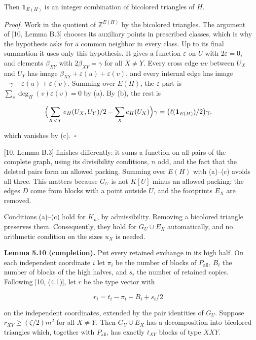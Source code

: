 \documentclass[english,11pt,a4paper]{article}
\begin{document}
Then \(\mathbf 1_{E(H)}\) is an integer combination of bicolored triangles of \(H\).

\emph{Proof.} Work in the quotient of \(\mathbb Z^{E(H)}\) by the bicolored triangles. The argument of {[}10, Lemma B.3{]} chooses its auxiliary points in prescribed classes, which is why the hypothesis asks for a common neighbor in every class. Up to its final summation it uses only this hypothesis. It gives a function \(\varepsilon\) on \(U\) with \(2\varepsilon=0\), and elements \(\beta_{XY}\) with \(2\beta_{XY}=\gamma\) for all \(X\ne Y\). Every cross edge \(uv\) between \(U_X\) and \(U_Y\) has image \(\beta_{XY}+\varepsilon(u)+\varepsilon(v)\), and every internal edge has image \(-\gamma+\varepsilon(u)+\varepsilon(v)\). Summing over \(E(H)\), the \(\varepsilon\)-part is \(\sum_v\deg_H(v)\varepsilon(v)=0\) by (a). By (b), the rest is

\nopagebreak[4]
\[\Bigl(\sum_{X<Y}e_H(U_X,U_Y)/2-\sum_Xe_H(U_X)\Bigr)\gamma=\bigl(\ell(\mathbf 1_{E(H)})/2\bigr)\gamma,\]

which vanishes by (c).~\(\square\)

{[}10, Lemma B.3{]} finishes differently: it sums a function on all pairs of the complete graph, using its divisibility conditions, \(n\) odd, and the fact that the deleted pairs form an allowed packing. Summing over \(E(H)\) with (a)--(c) avoids all three. This matters because \(G_U\) is not \(K[U]\) minus an allowed packing: the edges \(D\) come from blocks with a point outside \(U\), and the footprints \(E_X\) are removed.

Conditions (a)--(c) hold for \(K_n\), by admissibility. Removing a bicolored triangle preserves them. Consequently, they hold for \(G_U\cup E_X\) automatically, and no arithmetic condition on the sizes \(u_X\) is needed.

\textbf{Lemma 5.10 (completion).} Put every retained exchange in its high half. On each independent coordinate \(i\) let \(\pi_i\) be the number of blocks of \(P_{\mathrm{all}}\), \(B_i\) the number of blocks of the high halves, and \(s_i\) the number of retained copies. Following {[}10, (4.1){]}, let \(r\) be the type vector with

\nopagebreak[4]
\[r_i=t_i-\pi_i-B_i+s_i/2\]

on the independent coordinates, extended by the pair identities of \(G_U\). Suppose \(r_{XY}\ge(\zeta/2)m^2\) for all \(X\ne Y\). Then \(G_U\cup E_X\) has a decomposition into bicolored triangles which, together with \(P_{\mathrm{all}}\), has exactly \(t_{XY}\) blocks of type \(XXY\).
\end{document}
